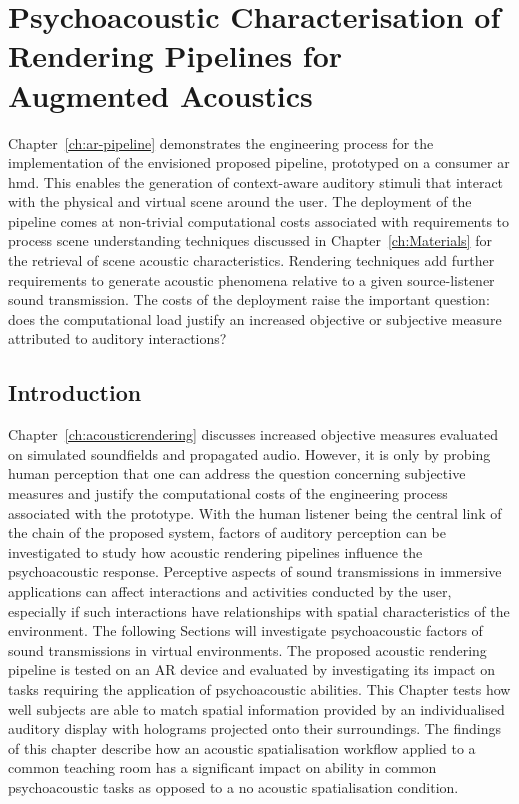 \chapter{Psychoacoustic Characterisation of Rendering Pipelines for Augmented Acoustics}\label{ch:Evaluation}
Chapter~\ref{ch:ar-pipeline} demonstrates the engineering process for the implementation of the envisioned proposed pipeline, prototyped on a consumer \acrshort{ar} \acrshort{hmd}. This enables the generation of context-aware auditory stimuli that interact with the physical and virtual scene around the user. The deployment of the pipeline comes at non-trivial computational costs associated with requirements to process scene understanding techniques discussed in Chapter~\ref{ch:Materials} for the retrieval of scene acoustic characteristics. Rendering techniques add further requirements to generate acoustic phenomena relative to a given source-listener sound transmission. The costs of the deployment raise the important question: does the computational load justify an increased objective or subjective measure attributed to auditory interactions? \par


\section{Introduction}
Chapter~\ref{ch:acousticrendering} discusses increased objective measures evaluated on simulated soundfields and propagated audio. However, it is only by probing human perception that one can address the question concerning subjective measures and justify the computational costs of the engineering process associated with the prototype. With the human listener being the central link of the chain of the proposed system, factors of auditory perception can be investigated to study how acoustic rendering pipelines influence the psychoacoustic response. Perceptive aspects of sound transmissions in immersive applications can affect interactions and activities conducted by the user, especially if such interactions have relationships with spatial characteristics of the environment. The following Sections will investigate psychoacoustic factors of sound transmissions in virtual environments. The proposed acoustic rendering pipeline is tested on an AR device and evaluated by investigating its impact on tasks requiring the application of psychoacoustic abilities. This Chapter tests how well subjects are able to match spatial information provided by an individualised auditory display with holograms projected onto their surroundings. The findings of this chapter describe how an acoustic spatialisation workflow applied to a common teaching room has a significant impact on ability in common psychoacoustic tasks as opposed to a no acoustic spatialisation condition.

